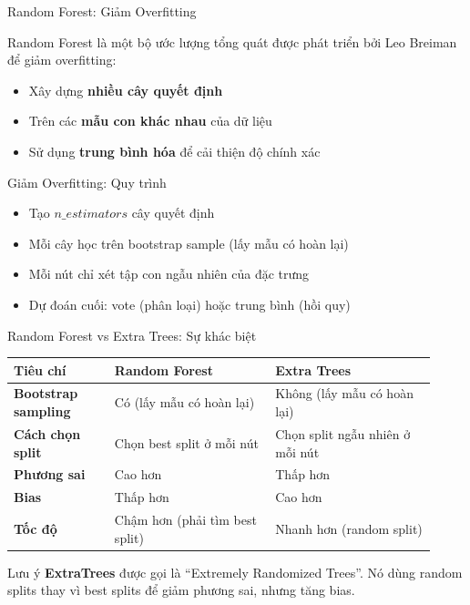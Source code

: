 \begin{frame}[shrink=8]{Random Forest: Giảm Overfitting}

                Random Forest là một bộ ước lượng tổng quát được phát triển bởi Leo Breiman để giảm overfitting:
                \begin{itemize}
                    \item Xây dựng \textbf{nhiều cây quyết định}
                    \item Trên các \textbf{mẫu con khác nhau} của dữ liệu
                    \item Sử dụng \textbf{trung bình hóa} để cải thiện độ chính xác
                \end{itemize}

            \begin{block}{Giảm Overfitting: Quy trình}
                \begin{itemize}
                    \item Tạo $n\_estimators$ cây quyết định
                    \item Mỗi cây học trên bootstrap sample (lấy mẫu có hoàn lại)
                    \item Mỗi nút chỉ xét tập con ngẫu nhiên của đặc trưng
                    \item Dự đoán cuối: vote (phân loại) hoặc trung bình (hồi quy)
                \end{itemize}
            \end{block}
\end{frame}

\begin{frame}[shrink=10]{Random Forest vs Extra Trees: Sự khác biệt}
    \centering
    \begin{tabular}{p{0.22\linewidth} p{0.35\linewidth} p{0.35\linewidth}}
        \toprule
        \textbf{Tiêu chí} & \textbf{Random Forest} & \textbf{Extra Trees} \\
        \midrule
        \textbf{Bootstrap sampling} & Có (lấy mẫu có hoàn lại) & Không (lấy mẫu có hoàn lại) \\
        \textbf{Cách chọn split} & Chọn best split ở mỗi nút & Chọn split ngẫu nhiên ở mỗi nút \\
        \textbf{Phương sai} & Cao hơn & Thấp hơn \\
        \textbf{Bias} & Thấp hơn & Cao hơn \\
        \textbf{Tốc độ} & Chậm hơn (phải tìm best split) & Nhanh hơn (random split) \\
        \bottomrule
    \end{tabular}
    \vspace{0.2cm}
    
    \begin{alertblock}{Lưu ý}
        \textbf{ExtraTrees} được gọi là ``Extremely Randomized Trees''. Nó dùng random splits thay vì best splits để giảm phương sai, nhưng tăng bias.
    \end{alertblock}
\end{frame}

